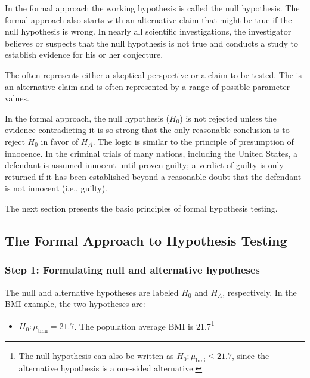 \begin{spacing}{1.5}
In the formal approach the working hypothesis is called the null hypothesis. The formal approach also starts with an alternative claim that might be true if the null hypothesis is wrong. In nearly all scientific investigations, the investigator believes or suspects that the null hypothesis is not true and conducts a study to establish evidence for his or her conjecture.

\begin{termBox}{
{The  often represents either a skeptical perspective or a claim to be tested. The  is an alternative claim and is often represented by a range of possible parameter values.}}
\end{termBox}

In the formal approach, the null hypothesis ($H_0$) is not rejected unless the evidence contradicting it is so strong that the only reasonable conclusion is to reject $H_0$ in favor of $H_A$. The logic is similar to the principle of presumption of innocence. In the criminal trials of many nations, including the United States, a defendant is assumed innocent until proven guilty; a verdict of guilty is only returned if it has been established beyond a reasonable doubt that the defendant is not innocent (i.e., guilty). 

The next section presents the basic principles of formal hypothesis testing.

\subsection{The Formal Approach to Hypothesis Testing}
\label{formalHypothesisTesting}


\subsubsection{Step 1: Formulating null and alternative hypotheses}

The null and alternative hypotheses are labeled $H_0$ and $H_A$, respectively.  In the BMI example, the two hypotheses are:

\begin{itemize}
	\item $H_0: \mu_{\text{bmi}} = 21.7$. The population average BMI is 21.7\footnote{The null hypothesis can also be written as $H_0: \mu_{\text{bmi}} \leq 21.7$, since the alternative hypothesis is a one-sided alternative.}
	

\end{itemize}
\end{spacing}
